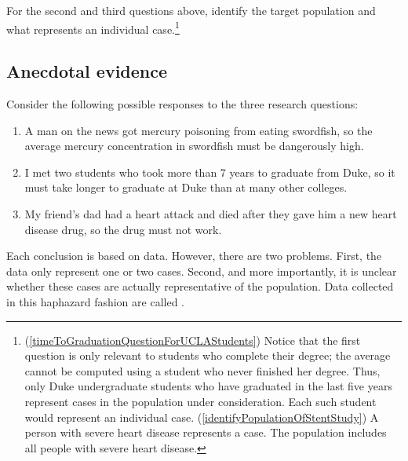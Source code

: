 \begin{exercise} \label{identifyingThePopulationForTwoQuestionsInPopAndSampSubsection}
For the second and third questions above, identify the target population and what represents an individual case.\footnote{(\ref{timeToGraduationQuestionForUCLAStudents}) Notice that the first question is only relevant to students who complete their degree; the average cannot be computed using a student who never finished her degree. Thus, only Duke undergraduate students who have graduated in the last five years represent cases in the population under consideration. Each such student would represent an individual case. (\ref{identifyPopulationOfStentStudy}) A person with severe heart disease represents a case. The population includes all people with severe heart disease.}
\end{exercise}


\subsection{Anecdotal evidence}
\label{anecdotalEvidenceSubsection}

Consider the following possible responses to the three research questions:
\begin{enumerate}
\item A man on the news got mercury poisoning from eating swordfish, so the average mercury concentration in swordfish must be dangerously high.
\item\label{iKnowThreeStudentsWhoTookMoreThan7YearsToGraduateAtDuke} I met two students who took more than 7 years to graduate from Duke, so it must take longer to graduate at Duke than at many other colleges.
\item\label{myFriendsDadDiedAfterSulphinpyrazon} My friend's dad had a heart attack and died after they gave him a new heart disease drug, so the drug must not work.
\end{enumerate}
Each conclusion is based on data. However, there are two problems. First, the data only represent one or two cases. Second, and more importantly, it is unclear whether these cases are actually representative of the population. Data collected in this haphazard fashion are called .

